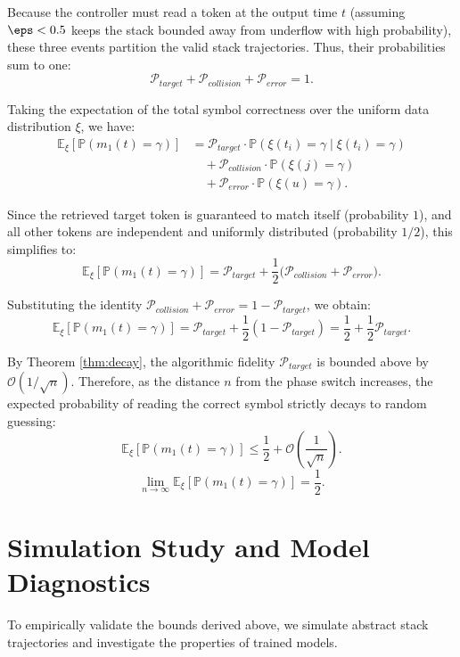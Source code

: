 \documentclass[10pt]{article} %
\begin{document}
Because the controller must read a token at the output time $t$ (assuming $\eps < 0.5$ keeps the stack bounded away from underflow with high probability), these three events partition the valid stack trajectories. Thus, their probabilities sum to one:
$$
\mathcal{P}_{target} + \mathcal{P}_{collision} + \mathcal{P}_{error} = 1.
$$

Taking the expectation of the total symbol correctness over the uniform data distribution $\xi$, we have:
\begin{align*}
\mathbb{E}_{\xi}[\mathbb{P}(m_1(t) = \gamma)] &= \mathcal{P}_{target} \cdot \mathbb{P}(\xi(t_i) = \gamma \mid \xi(t_i)=\gamma) \\
&\quad + \mathcal{P}_{collision} \cdot \mathbb{P}(\xi(j) = \gamma) \\
&\quad + \mathcal{P}_{error} \cdot \mathbb{P}(\xi(u) = \gamma).
\end{align*}

Since the retrieved target token is guaranteed to match itself (probability $1$), and all other tokens are independent and uniformly distributed (probability $1/2$), this simplifies to:
$$
\mathbb{E}_{\xi}[\mathbb{P}(m_1(t) = \gamma)] = \mathcal{P}_{target} + \frac{1}{2} \big(\mathcal{P}_{collision} + \mathcal{P}_{error}\big).
$$

Substituting the identity $\mathcal{P}_{collision} + \mathcal{P}_{error} = 1 - \mathcal{P}_{target}$, we obtain:
$$
\mathbb{E}_{\xi}[\mathbb{P}(m_1(t) = \gamma)] = \mathcal{P}_{target} + \frac{1}{2} (1 - \mathcal{P}_{target}) = \frac{1}{2} + \frac{1}{2} \mathcal{P}_{target}.
$$

By Theorem \ref{thm:decay}, the algorithmic fidelity $\mathcal{P}_{target}$ is bounded above by $\mathcal{O}(1/\sqrt{n})$. Therefore, as the distance $n$ from the phase switch increases, the expected probability of reading the correct symbol strictly decays to random guessing:
$$
\mathbb{E}_{\xi}[\mathbb{P}(m_1(t) = \gamma)] \leq \frac{1}{2} + \mathcal{O}\left(\frac{1}{\sqrt{n}}\right).
$$
$$
\lim_{n \to \infty} \mathbb{E}_{\xi}[\mathbb{P}(m_1(t) = \gamma)] = \frac{1}{2}.
$$



\section{Simulation Study and Model Diagnostics}

To empirically validate the bounds derived above, we simulate abstract stack trajectories and investigate the properties of trained models.
\end{document}
